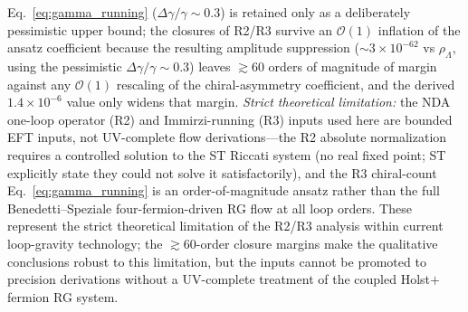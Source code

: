 \documentclass[aps,prd,twocolumn,superscriptaddress,showpacs,preprintnumbers,nofootinbib,longbibliography,floatfix]{revtex4-2}
\begin{document}
Eq.~\eqref{eq:gamma_running} ($\Delta\gamma/\gamma\sim0.3$) is retained
only as a deliberately pessimistic upper bound; the closures of R2/R3
survive an $\mathcal{O}(1)$ inflation of the ansatz coefficient because
the resulting amplitude suppression ($\sim 3\times 10^{-62}$ vs
$\rho_\Lambda$, using the pessimistic $\Delta\gamma/\gamma \sim 0.3$)
leaves $\gtrsim 60$ orders of magnitude of margin against any
$\mathcal{O}(1)$ rescaling of the chiral-asymmetry coefficient, and the
derived $1.4\times10^{-6}$ value only widens that margin.
\emph{Strict theoretical limitation:} the NDA one-loop operator (R2) and
Immirzi-running (R3) inputs used here are bounded EFT inputs, not UV-complete
flow derivations---the R2 absolute normalization requires a controlled solution
to the ST Riccati system (no real fixed point; ST explicitly state they could
not solve it satisfactorily), and the R3 chiral-count
Eq.~\eqref{eq:gamma_running} is an order-of-magnitude ansatz rather than the
full Benedetti--Speziale four-fermion-driven RG flow at all loop orders.
These represent the strict theoretical limitation of the R2/R3 analysis within
current loop-gravity technology; the $\gtrsim 60$-order closure margins make
the qualitative conclusions robust to this limitation, but the inputs cannot be
promoted to precision derivations without a UV-complete treatment of the coupled
Holst$+$fermion RG system.
\end{document}
